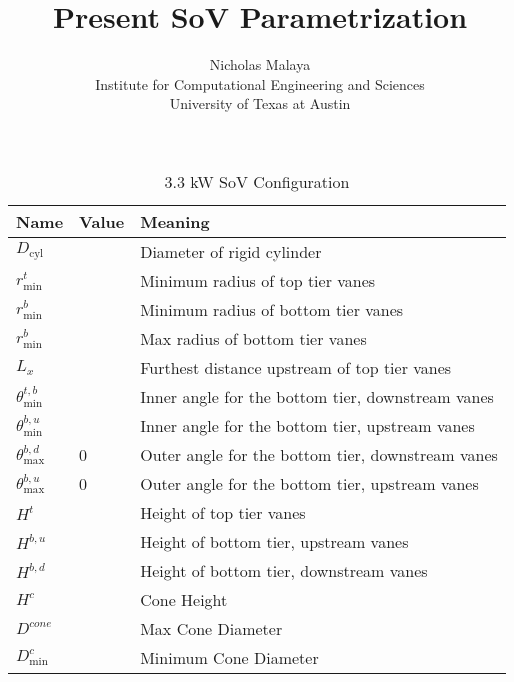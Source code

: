 \documentclass{article}
\title{\bf{Present SoV Parametrization}}
\author{Nicholas Malaya \\ Institute for Computational Engineering and
Sciences \\ University of Texas at Austin} \date{}
\begin{document}
\maketitle

\newpage

\begin{table}[]
\centering
\begin{tabular}{lll}
Name               & Value & Meaning                    \\
 \hline
$D_{\text{cyl}}$            &       & Diameter of rigid cylinder \\
$r^t_{\text{min}}$          &       & Minimum radius of top tier vanes \\
$r^b_{\text{min}}$          &       & Minimum radius of bottom tier vanes \\
$r^b_{\text{min}}$          &       & Max radius of bottom tier vanes \\
       $L_x$                &       & Furthest distance upstream of top
	 tier vanes \\
$\theta_{\text{min}}^{t,b}$ &       & Inner angle for the bottom 
 tier, downstream vanes \\
$\theta_{\text{min}}^{b,u}$ &       & Inner angle for the bottom
 tier, upstream vanes \\
$\theta_{\text{max}}^{b,d}$ &   0   & Outer angle for the bottom 
 tier, downstream vanes \\
$\theta_{\text{max}}^{b,u}$ &   0   & Outer angle for the bottom
 tier, upstream vanes \\
 $H^t    $                  &       & Height of top tier vanes \\
 $H^{b,u}$                  &       & Height of bottom tier, upstream vanes \\
 $H^{b,d}$                  &       & Height of bottom tier, downstream vanes \\
 $H^{c}$                    &       & Cone Height \\
 $D^{cone}$                 &       & Max Cone Diameter \\
 $D_\text{min}^{c}$         &       & Minimum Cone Diameter \\
\end{tabular}
\label{my-label}
\caption{3.3 kW SoV Configuration}
\end{table}
\end{document}
